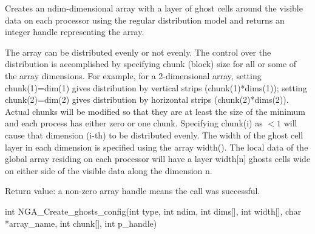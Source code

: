 \documentclass[10pt]{article}
\begin{document}
\begin{desc}

Creates an ndim-dimensional array with a layer of ghost cells around the
visible data on each processor using the regular distribution model and returns
an integer handle representing the array.

The array can be distributed evenly or not evenly. The control over the
distribution is accomplished by specifying chunk (block) size for all or some
of the array dimensions. For example, for a 2-dimensional array, setting
chunk(1)=dim(1) gives distribution by vertical strips (chunk(1)*dims(1));
setting chunk(2)=dim(2) gives distribution by horizontal strips
(chunk(2)*dims(2)). Actual chunks will be modified so that they are at least
the size of the minimum and each process has either zero or one chunk.
Specifying chunk(i) as $< 1$ will cause that dimension (i-th) to be distributed
evenly. The width of the ghost cell layer in each dimension is specified using
the array width(). The local data of the global array residing on each
processor will have a layer width[n] ghosts cells wide on either side of the
visible data along the dimension n.

Return value: a non-zero array handle means the call was successful.

\end{desc}



\begin{capi}
\begin{ccode}
int NGA_Create_ghosts_config(int type, int ndim, int dims[],
                             int width[], char *array_name, int chunk[],
                             int p_handle)
\end{ccode}
\begin{funcargs}
\end{funcargs}
\end{capi}
\end{document}
